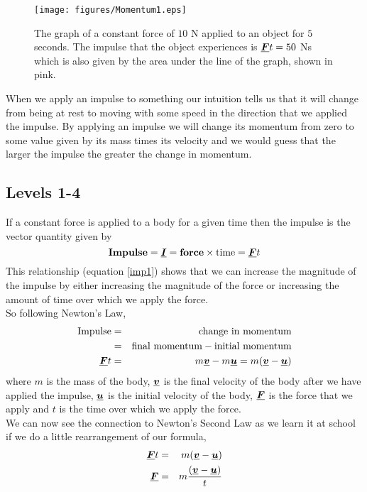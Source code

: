 \begin{wrapfigure}{r}{7cm} 
\center
\texttt{[image: figures/Momentum1.eps]}
\caption{The graph of a constant force of $10$ N applied to an object for $5$ seconds.  The impulse that the object experiences is ${\mathit{\underline{\boldsymbol{F}}}}t = 50$ Ns which is also given by the area under the line of the graph, shown in pink.}\label{impulse1}
\end{wrapfigure}

\noindent When we apply an impulse to something our intuition tells us that it will change from being at rest to moving with some speed in the direction that we applied the impulse.  By applying an impulse we will change its momentum from zero to some value given by its mass times its velocity and we would guess that the larger the impulse the greater the change in momentum.

\subsection*{Levels 1-4}
If a constant force is applied to a body for a given time then the impulse is the vector quantity given by
\begin{equation} \label{imp1}
\mbox{\bf Impulse} = \mathit{\underline{\boldsymbol{I}}} = \mbox{\bf force} \times \mbox{time} ={\mathit{\underline{\boldsymbol{F}}}}t
\end{equation}
This relationship (equation \ref{imp1}) shows that we can increase the magnitude of the impulse by either increasing the magnitude of the force or increasing the amount of time over which we apply the force.\\

\noindent So following Newton's Law,
\begin{eqnarray}
\mbox{Impulse}&=&\mbox{change in momentum}\nonumber \\
&=&\mbox{final momentum} - \mbox{initial momentum}\nonumber \\
{\mathit{\underline{\boldsymbol{F}}}}t &=& m{\mathit{\underline{\boldsymbol{v}}}}-m{\mathit{\underline{\boldsymbol{u}}}} = m({\mathit{\underline{\boldsymbol{v}}}}-{\mathit{\underline{\boldsymbol{u}}}})
\end{eqnarray}
where $m$ is the mass of the body, ${\mathit{\underline{\boldsymbol{v}}}}$ is the final velocity of the body after we have applied the impulse, ${\mathit{\underline{\boldsymbol{u}}}}$ is the initial velocity of the body, ${\mathit{\underline{\boldsymbol{F}}}}$ is the force that we apply and $t$ is the time over which we apply the force.\\

\noindent We can now see the connection to Newton's Second Law as we learn it at school if we do a little rearrangement of our formula,
\begin{eqnarray}
{\mathit{\underline{\boldsymbol{F}}}}t&=&m({\mathit{\underline{\boldsymbol{v}}}}-{\mathit{\underline{\boldsymbol{u}}}})\nonumber \\
{\mathit{\underline{\boldsymbol{F}}}}&=&m\frac{({\mathit{\underline{\boldsymbol{v}}}}-{\mathit{\underline{\boldsymbol{u}}}})}{t}
\end{eqnarray}

